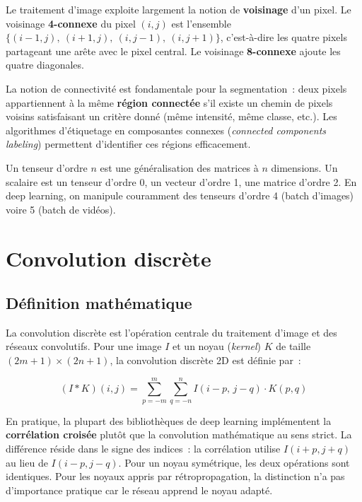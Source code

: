 \documentclass[a4paper,11pt,twoside]{book}
\begin{document}
Le traitement d'image exploite largement la notion de \textbf{voisinage} d'un pixel. Le voisinage \textbf{4-connexe} du pixel $(i, j)$ est l'ensemble $\{(i{-}1,j),\ (i{+}1,j),\ (i,j{-}1),\ (i,j{+}1)\}$, c'est-à-dire les quatre pixels partageant une arête avec le pixel central. Le voisinage \textbf{8-connexe} ajoute les quatre diagonales.

La notion de connectivité est fondamentale pour la segmentation~: deux pixels appartiennent à la même \textbf{région connectée} s'il existe un chemin de pixels voisins satisfaisant un critère donné (même intensité, même classe, etc.). Les algorithmes d'étiquetage en composantes connexes (\textit{connected components labeling}) permettent d'identifier ces régions efficacement.

\begin{notebox}
Un tenseur d'ordre $n$ est une généralisation des matrices à $n$ dimensions. Un scalaire est un tenseur d'ordre 0, un vecteur d'ordre 1, une matrice d'ordre 2. En deep learning, on manipule couramment des tenseurs d'ordre 4 (batch d'images) voire 5 (batch de vidéos).
\end{notebox}


\chapter{Convolution discrète}

\section{Définition mathématique}

La convolution discrète est l'opération centrale du traitement d'image et des réseaux convolutifs. Pour une image $I$ et un noyau (\textit{kernel}) $K$ de taille $(2m{+}1) \times (2n{+}1)$, la convolution discrète 2D est définie par~:

\begin{defbox}
\[
(I * K)(i, j) = \sum_{p=-m}^{m} \sum_{q=-n}^{n} I(i-p,\, j-q) \cdot K(p, q)
\]
\end{defbox}

En pratique, la plupart des bibliothèques de deep learning implémentent la \textbf{corrélation croisée} plutôt que la convolution mathématique au sens strict. La différence réside dans le signe des indices~: la corrélation utilise $I(i+p, j+q)$ au lieu de $I(i-p, j-q)$. Pour un noyau symétrique, les deux opérations sont identiques. Pour les noyaux appris par rétropropagation, la distinction n'a pas d'importance pratique car le réseau apprend le noyau adapté.
\end{document}
